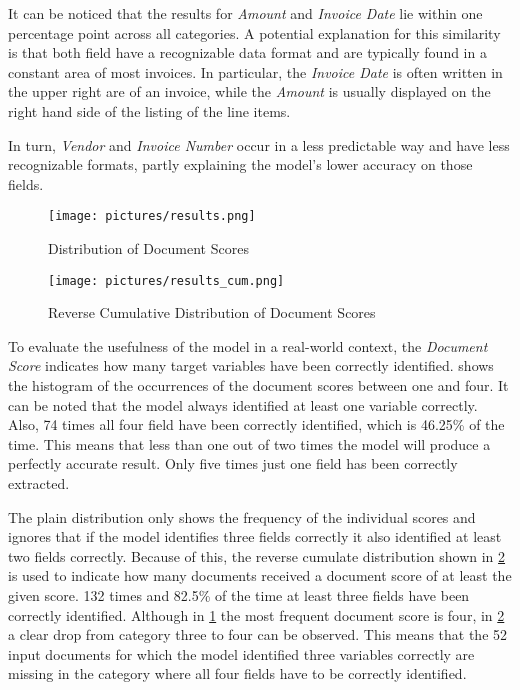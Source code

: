 It can be noticed that the results for \textit{Amount} and \textit{Invoice Date} lie within one percentage point across all categories. A potential explanation for this similarity is that both field have a recognizable data format and are typically found in a constant area of most invoices. In particular, the \textit{Invoice Date} is often written in the upper right are of an invoice, while the \textit{Amount} is usually displayed on the right hand side of the listing of the line items.

In turn, \textit{Vendor} and \textit{Invoice Number} occur in a less predictable way and have less recognizable formats, partly explaining the model's lower accuracy on those fields. 

\begin{figure}[!ht]
    \centering 
    \texttt{[image: pictures/results.png]}
    \caption{Distribution of Document Scores}
    \label{pic:results_1}    %
\end{figure}
\begin{figure}[!ht]
    \centering 
    \texttt{[image: pictures/results\_cum.png]}
    \caption{Reverse Cumulative Distribution of Document Scores}
    \label{pic:results_1_cum}    %
\end{figure}

To evaluate the usefulness of the model in a real-world context, the \textit{Document Score} indicates how many target variables have been correctly identified.  shows the histogram of the occurrences of the document scores between one and four. It can be noted that the model always identified at least one variable correctly. Also, 74 times all four field have been correctly identified, which is 46.25\% of the time. This means that less than one out of two times the model will produce a perfectly accurate result. Only five times just one field has been correctly extracted.

The plain distribution only shows the frequency of the individual scores and ignores that if the model identifies three fields correctly it also identified at least two fields correctly. Because of this, the reverse cumulate distribution shown in \cref{pic:results_1_cum} is used to indicate how many documents received a document score of at least the given score. 132 times and 82.5\% of the time at least three fields have been correctly identified. Although in \cref{pic:results_1} the most frequent document score is four, in \cref{pic:results_1_cum} a clear drop from category three to four can be observed. This means that the 52 input documents for which the model identified three variables correctly are missing in the category where all four fields have to be correctly identified.


